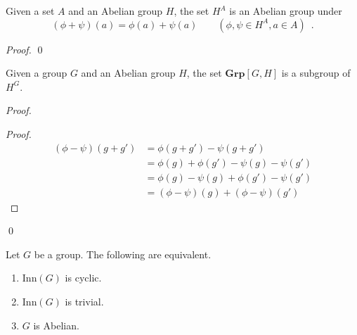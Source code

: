\begin{prop}
    Given a set $A$ and an Abelian group $H$, the set $H^A$ is an Abelian group under
    \[ (\phi + \psi)(a) = \phi(a) + \psi(a) \qquad (\phi,\psi \in H^A, a \in A) \enspace . \]
\end{prop}

\begin{proof}
    \pf
    \qed
\end{proof}

\begin{prop}
    Given a group $G$ and an Abelian group $H$, the set $\mathbf{Grp}[G,H]$ is a subgroup of $H^G$.
\end{prop}

\begin{proof}
    \pf
    \begin{proof}
        \pf
        \begin{align*}
            (\phi - \psi)(g + g') & = \phi(g + g') - \psi(g + g')             \\
                                  & = \phi(g) + \phi(g') - \psi(g) - \psi(g') \\
                                  & = \phi(g) - \psi(g) + \phi(g') - \psi(g') \\
                                  & = (\phi - \psi)(g) + (\phi - \psi)(g')
        \end{align*}
    \end{proof}
    \qed
\end{proof}

\begin{prop}
Let $G$ be a group. The following are equivalent.
\begin{enumerate}
\item $\mathrm{Inn}(G)$ is cyclic.
\item $\mathrm{Inn}(G)$ is trivial.
\item $G$ is Abelian.
\end{enumerate}
\end{prop}

